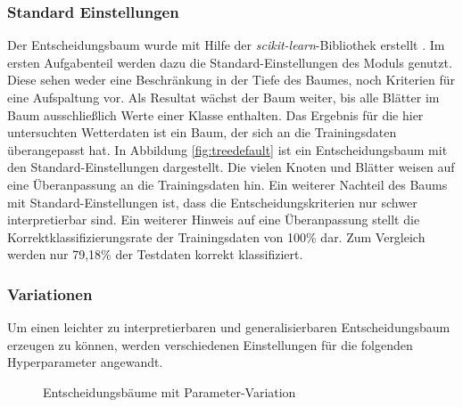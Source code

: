 \subsubsection{Standard Einstellungen}
Der Entscheidungsbaum wurde mit Hilfe der \emph{scikit-learn}-Bibliothek erstellt \cite{scikit-learn}. Im ersten Aufgabenteil werden dazu die Standard-Einstellungen des Moduls genutzt. Diese sehen weder eine Beschränkung in der Tiefe des Baumes, noch Kriterien für eine Aufspaltung vor. Als Resultat wächst der Baum weiter, bis alle Blätter im Baum ausschließlich Werte einer Klasse enthalten. Das Ergebnis für die hier untersuchten Wetterdaten ist ein Baum, der sich an die Trainingsdaten überangepasst hat. In Abbildung \ref{fig:treedefault} ist ein Entscheidungsbaum mit den Standard-Einstellungen dargestellt. Die vielen Knoten und Blätter weisen auf eine Überanpassung an die Trainingsdaten hin. Ein weiterer Nachteil des Baums mit Standard-Einstellungen ist, dass die Entscheidungskriterien nur schwer interpretierbar sind. Ein weiterer Hinweis auf eine Überanpassung stellt die Korrektklassifizierungsrate der Trainingsdaten von 100\% dar. Zum Vergleich werden nur 79,18\% der Testdaten korrekt klassifiziert.


\subsubsection{Variationen}
\label{variation_tree}
Um einen leichter zu interpretierbaren und generalisierbaren Entscheidungsbaum erzeugen zu können, werden verschiedenen Einstellungen für die folgenden Hyperparameter angewandt. 

\begin{figure}[h]
	\centering
	\vspace*{-0.9 cm}
	\hfill
	\hfill
	\caption{Entscheidungsbäume mit Parameter-Variation}
\end{figure}

